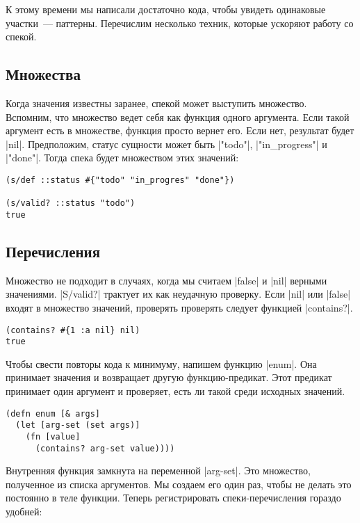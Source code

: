 К этому времени мы написали достаточно кода, чтобы увидеть одинаковые
участки~--- паттерны. Перечислим несколько техник, которые ускоряют работу со
спекой.

\subsection{Множества}

Когда значения известны заранее, спекой может выступить множество. Вспомним, что
множество ведет себя как функция одного аргумента. Если такой аргумент есть в
множестве, функция просто вернет его. Если нет, результат будет
\spverb|nil|. Предположим, статус сущности может быть \spverb|"todo"|, \spverb|"in_progress"| и
\spverb|"done"|. Тогда спека будет множеством этих значений:

\begin{verbatim}
(s/def ::status #{"todo" "in_progres" "done"})

(s/valid? ::status "todo")
true
\end{verbatim}

\subsection{Перечисления}

Множество не подходит в случаях, когда мы считаем \spverb|false| и \spverb|nil| верными
значениями. \spverb|S/valid?| трактует их как неудачную проверку. Если \spverb|nil| или
\spverb|false| входят в множество значений, проверять проверять следует функцией
\spverb|contains?|.

\begin{verbatim}
(contains? #{1 :a nil} nil)
true
\end{verbatim}

Чтобы свести повторы кода к минимуму, напишем функцию \spverb|enum|. Она принимает
значения и возвращает другую функцию-предикат. Этот предикат принимает один
аргумент и проверяет, есть ли такой среди исходных значений.

\begin{verbatim}
(defn enum [& args]
  (let [arg-set (set args)]
    (fn [value]
      (contains? arg-set value))))
\end{verbatim}

Внутренняя функция замкнута на переменной \spverb|arg-set|. Это множество, полученное
из списка аргументов. Мы создаем его один раз, чтобы не делать это постоянно в
теле функции. Теперь регистрировать спеки-перечисления гораздо удобней:

